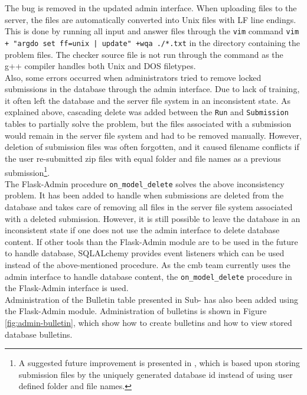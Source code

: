 The bug is removed in the updated admin interface. When uploading files to the server, the files are automatically converted into Unix files with LF line endings. This is done by running all input and answer files through the \texttt{vim} \cite{VIM} command \texttt{vim + "argdo set ff=unix | update" +wqa ./*.txt} in the directory containing the problem files. The checker source file is not run through the command as the g++ compiler handles both Unix and DOS filetypes. \\

Also, some errors occurred when administrators tried to remove locked submissions in the database through the admin interface. Due to lack of training, it often left the database and the server file system in an inconsistent state. As explained above, cascading delete was added between the \texttt{Run} and \texttt{Submission} tables to partially solve the problem, but the files associated with a submission would remain in the server file system and had to be removed manually. However, deletion of submission files was often forgotten, and it caused filename conflicts if the user re-submitted zip files with equal folder and file names as a previous submission\footnote{A suggested future improvement is presented in , which is based upon storing submission files by the uniquely generated database id instead of using user defined folder and file names.}.\\

The Flask-Admin \cite{FLASKADMIN} procedure \texttt{on\_model\_delete} solves the above inconsistency problem. It has been added to handle when submissions are deleted from the database and takes care of removing all files in the server file system associated with a deleted submission. However, it is still possible to leave the database in an inconsistent state if one does not use the admin interface to delete database content. If other tools than the Flask-Admin module are to be used in the future to handle database, SQLALchemy provides event listeners which can be used instead of the above-mentioned procedure. As the \gls{cmb} team currently uses the admin interface to handle database content, the \texttt{on\_model\_delete} procedure in the Flask-Admin interface is used. \\

Administration of the Bulletin table presented in Sub- has also been added using the Flask-Admin module. Administration of bulletins is shown in Figure \ref{fig:admin-bulletin}, which show how to create bulletins and how to view stored database bulletins.

